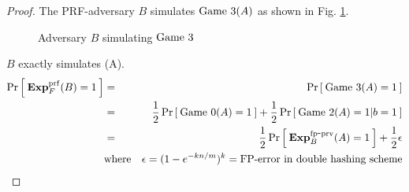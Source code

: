 \begin{proof}
The PRF-adversary $B$ simulates $\text{Game 3}(A)$ as shown in Fig. \ref{fig:AdvB}. 
\begin{figure}[h]
\centering
{}
\caption{Adversary $B$ simulating $\text{Game 3}$}\label{fig:AdvB}
\end{figure}

$B$ exactly simulates (A).
\begin{eqnarray}
\nonumber\Pr\left[\: \mathbf{Exp}^{\mathrm{prf}}_{F}(B) = 1 \:\right] &=&  \Pr\left[\: \text{Game 3}(A)=1 \:\right]\\
\nonumber &=& \frac{1}{2}\Pr\left[\: \text{Game 0}(A)=1 \:\right] + \frac{1}{2}\Pr\left[\: \text{Game 2}(A)=1|b=1 \:\right]\\
\nonumber &=&  \frac{1}{2}\Pr\left[\: \mathrm{\mathbf{Exp}}^{\mathrm{fp\mbox{-}prv}}_{B}(A)=1 \:\right] + \frac{1}{2}\epsilon\\
 & \mathrm{where}& \epsilon = (1-e^{-kn/m})^k = \text{FP-error in double hashing scheme}
\end{eqnarray}


\end{proof}
